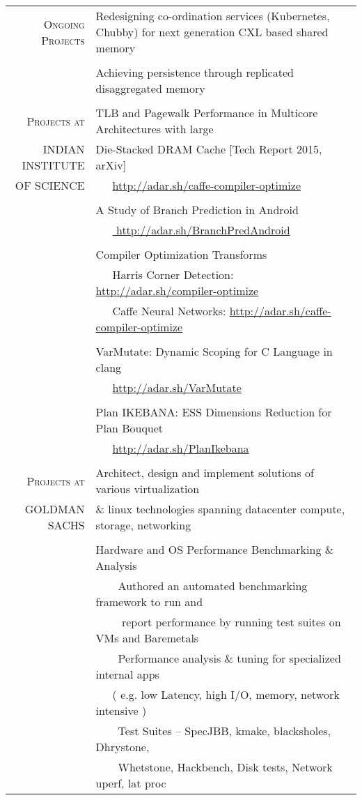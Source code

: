 \documentclass[a4paper,10pt]{article} %
\newcommand{\tabitem}{~~\llap{\textbullet}~~}
\begin{document}
\begin{tabular}{rp{12cm}}
\textsc{Ongoing Projects} & Redesigning co-ordination services (Kubernetes, Chubby) for next generation CXL based shared memory \\
& \\
& Achieving persistence through replicated disaggregated memory \\
& \\
\textsc{Projects at} & TLB and Pagewalk Performance in Multicore Architectures with large \\
\textsc{INDIAN INSTITUTE} & Die-Stacked DRAM Cache \hfill [Tech Report 2015, arXiv]\\
\textsc{OF SCIENCE} & ~~~\href{http://adar.sh/caffe-compiler-optimize}{http://adar.sh/caffe-compiler-optimize}\\
& \\
& A Study of Branch Prediction in Android \\
& ~~~\href{http://adar.sh/BranchPredAndroid}{ http://adar.sh/BranchPredAndroid} \\
& \\
& Compiler Optimization Transforms\\
& ~~~Harris Corner Detection: \href{http://adar.sh/compiler-optimize}{http://adar.sh/compiler-optimize}\\
& ~~~Caffe Neural Networks:  \href{http://adar.sh/caffe-compiler-optimize}{http://adar.sh/caffe-compiler-optimize}\\
& \\
& VarMutate: Dynamic Scoping for C Language in clang\\
& ~~~\href{http://adar.sh/VarMutate}{http://adar.sh/VarMutate} \\
& \\
& Plan IKEBANA: ESS Dimensions Reduction for Plan Bouquet \\
& ~~~\href{http://adar.sh/PlanIkebana}{http://adar.sh/PlanIkebana}\\
&\\
\textsc{Projects at}  &  Architect, design and implement solutions of various virtualization \\
\textsc{GOLDMAN SACHS} &   \& linux technologies spanning datacenter compute, storage, networking \\
&\\
& Hardware and OS Performance Benchmarking \& Analysis\\
& \tabitem Authored an automated benchmarking framework to run and \\
& ~~~~ report performance by running test suites on VMs and Baremetals\\
& \tabitem Performance analysis \& tuning for specialized internal apps \\
& ~~~( e.g. low Latency, high I/O, memory, network intensive )\\
& \tabitem Test Suites – SpecJBB, kmake, blacksholes, Dhrystone, \\
& ~~~~Whetstone, Hackbench, Disk tests, Network uperf, lat proc \\


\end{tabular}
\end{document}
